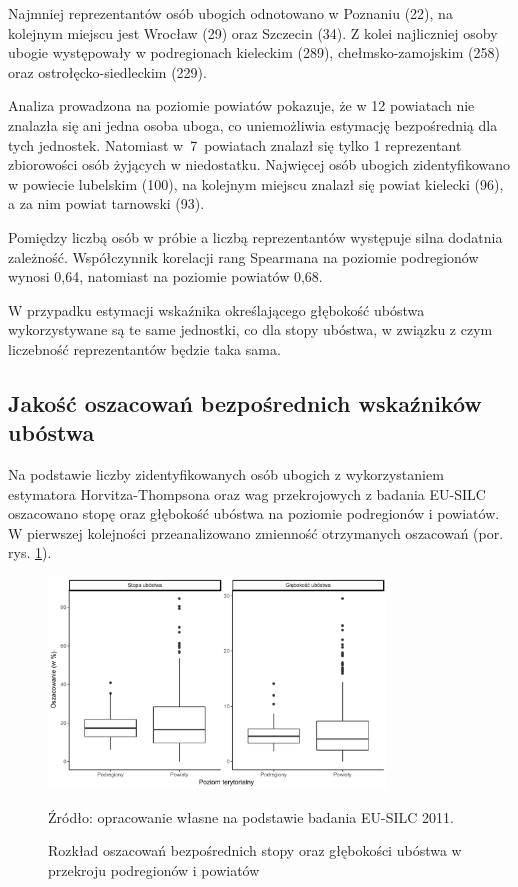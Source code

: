 Najmniej reprezentantów osób ubogich odnotowano w Poznaniu (22), na kolejnym miejscu jest Wrocław (29) oraz Szczecin (34). Z kolei najliczniej osoby ubogie występowały w podregionach kieleckim (289), chełmsko-zamojskim (258) oraz ostrołęcko-siedleckim (229).

Analiza prowadzona na poziomie powiatów pokazuje, że w 12 powiatach nie znalazła się ani jedna osoba uboga, co uniemożliwia estymację bezpośrednią dla tych jednostek. Natomiast w~7~powiatach znalazł się tylko 1 reprezentant zbiorowości osób żyjących w niedostatku. Najwięcej osób ubogich zidentyfikowano w powiecie lubelskim (100), na kolejnym miejscu znalazł się powiat kielecki (96), a za nim powiat tarnowski (93).

Pomiędzy liczbą osób w próbie a liczbą reprezentantów występuje silna dodatnia zależność. Współczynnik korelacji rang Spearmana na poziomie podregionów wynosi 0,64, natomiast na poziomie powiatów 0,68.

W przypadku estymacji wskaźnika określającego głębokość ubóstwa wykorzystywane są te same jednostki, co dla stopy ubóstwa, w związku z czym liczebność reprezentantów będzie taka sama.

\subsection{Jakość oszacowań bezpośrednich wskaźników ubóstwa}

Na podstawie liczby zidentyfikowanych osób ubogich z wykorzystaniem estymatora Horvitza-Thompsona oraz wag przekrojowych z badania EU-SILC oszacowano stopę oraz głębokość ubóstwa na poziomie podregionów i powiatów. W pierwszej kolejności przeanalizowano zmienność otrzymanych oszacowań (por. rys. \ref{fig:zmiennosc_ht}).

\begin{figure}[htp]
\centering
\includegraphics[width=0.8\textwidth]{04_wykresy/zmiennosc_ht-1.pdf}
\caption{Rozkład oszacowań bezpośrednich stopy oraz głębokości ubóstwa w przekroju podregionów i powiatów}
\small{Źródło: opracowanie własne na podstawie badania EU-SILC 2011.}
\label{fig:zmiennosc_ht}
\end{figure}


